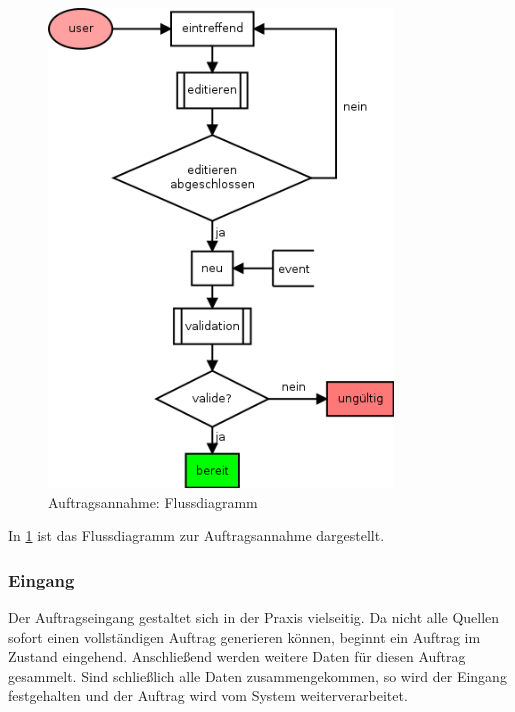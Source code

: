 \begin{figure}[ht]
  \centering
  \includegraphics[height=5in]{imageinput/lebenszyklus-auftrag-eingang.png}
  \caption{Auftragsannahme: Flussdiagramm}
  \label{fig:lebenszyklus-auftrag-eingang}
\end{figure}

In \cref{fig:lebenszyklus-auftrag-eingang} ist das Flussdiagramm zur Auftragsannahme dargestellt.
\FloatBarrier

\subsubsection{Eingang}

Der Auftragseingang gestaltet sich in der Praxis vielseitig.
Da nicht alle Quellen sofort einen vollständigen Auftrag generieren können,
beginnt ein Auftrag im Zustand eingehend.
Anschließend werden weitere Daten für diesen Auftrag gesammelt.
Sind schließlich alle Daten zusammengekommen,
so wird der Eingang festgehalten und der Auftrag wird vom System weiterverarbeitet.

